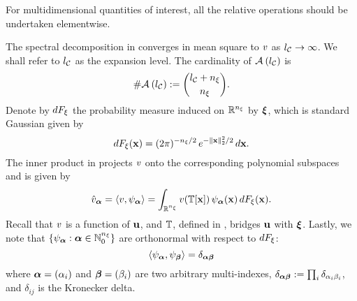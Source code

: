 \begin{remark} 
For multidimensional quantities of interest, all the relative operations should be undertaken elementwise.
\end{remark}
The spectral decomposition in  converges in mean square to $\w$ as $\nclevel \to \infty$.
We shall refer to $\nclevel$ as the expansion level.
The cardinality of $\chaosMultiindexSet{\nclevel}$ is
\[
  \cardinality{\chaosMultiindexSet{\nclevel}} := { \nclevel + \nvars \choose \nvars }.
\]
Denote by $\d\distribution_\z$ the probability measure induced on $\real^\nvars$ by $\vz$, which is standard Gaussian given by
\begin{equation} \xelab{standard-gaussian-measure}
  \d\distribution_\z(\point) = (2 \pi)^{-\nvars/2} \, e^{-\norm[2]{\point}^2 / 2} \, \d\point.
\end{equation}
The inner product in  projects $\w$ onto the corresponding polynomial subspaces and is given by
\begin{equation} \xelab{orthogonal-projection}
  \coefficient{\w}_{\multiindex} = \innerProduct{\w, \polynomial_{\multiindex}} = \int_{\real^{\nvars}} \w(\transformation[\point]) \, \polynomial_{\multiindex}(\point) \, \d\distribution_\z(\point).
\end{equation}
Recall that $\w$ is a function of $\vu$, and $\transformation$, defined in , bridges $\vu$ with $\vz$.
Lastly, we note that $\{ \polynomial_{\multiindex}: \multiindex \in \natural^\nvars \}$ are orthonormal with respect to $\d\distribution_\z$:
\[
  \innerProduct{\polynomial_{\multiindex}, \polynomial_{\multiindex[\beta]}} = \delta_{\multiindex \multiindex[\beta]}
\]
where $\multiindex = (\alpha_i)$ and $\multiindex[\beta] = (\beta_i)$ are two arbitrary multi-indexes, $\delta_{\multiindex \multiindex[\beta]} := \prod_i \delta_{\alpha_i \beta_i}$, and $\delta_{ij}$ is the Kronecker delta.
